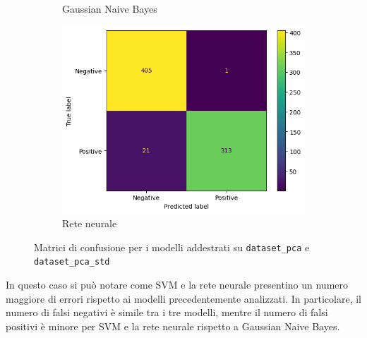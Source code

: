 \begin{figure}[!ht]
\begin{subfigure}{.3\textwidth}
        \caption{Gaussian Naive Bayes}
        \label{fig:matrice_di_confusione_per_GNB_pca}
    \end{subfigure}
    \hfill
    \begin{subfigure}{.3\textwidth}
        \centering
        \includegraphics[width=\textwidth]{img/rete/matrice_confusione_PCA.png}
        \caption{Rete neurale}
        \label{fig:matrice_di_confusione_per_NN_pca}
    \end{subfigure}
    \caption{Matrici di confusione per i modelli addestrati su \texttt{dataset\_pca} e \texttt{dataset\_pca\_std}}
    \label{fig:matrice_di_confusione_per_pca}
\end{figure}

In questo caso si può notare come SVM e la rete neurale presentino un numero
maggiore di errori rispetto ai modelli precedentemente analizzati. In particolare,
il numero di falsi negativi è simile tra i tre modelli, mentre il numero di falsi
positivi è minore per SVM e la rete neurale rispetto a Gaussian Naive Bayes.

